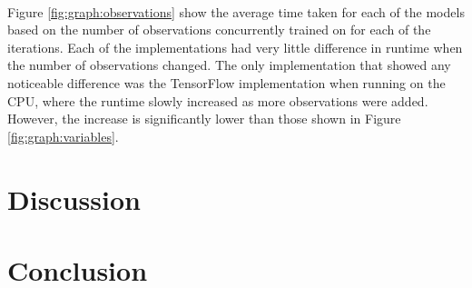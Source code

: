 \documentclass[12pt]{article}
\begin{document}
\paragraph{}
Figure \ref{fig:graph:observations} show the average time taken for each of the models based on the number of observations concurrently trained on for each of the iterations.
Each of the implementations had very little difference in runtime when the number of observations changed.
The only implementation that showed any noticeable difference was the TensorFlow implementation when running on the CPU, where the runtime slowly increased as more observations were added.
However, the increase is significantly lower than those shown in Figure \ref{fig:graph:variables}.

\section{Discussion}


%

\section{Conclusion}

%

\newpage


\end{document}
